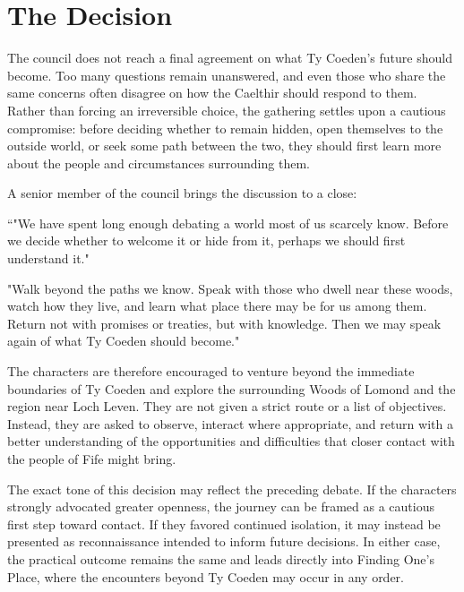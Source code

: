 \section*{The Decision}
{\entryfont The council does not reach a final agreement on what Ty Coeden's future should become. Too many questions remain unanswered, and even those who share the same concerns often disagree on how the Caelthir should respond to them. Rather than forcing an irreversible choice, the gathering settles upon a cautious compromise: before deciding whether to remain hidden, open themselves to the outside world, or seek some path between the two, they should first learn more about the people and circumstances surrounding them.

A senior member of the council brings the discussion to a close:}
\begin{DndReadAloud}
	“"We have spent long enough debating a world most of us scarcely know. Before we decide whether to welcome it or hide from it, perhaps we should first understand it."

	"Walk beyond the paths we know. Speak with those who dwell near these woods, watch how they live, and learn what place there may be for us among them. Return not with promises or treaties, but with knowledge. Then we may speak again of what Ty Coeden should become."
\end{DndReadAloud}
{\noindent\entryfont The characters are therefore encouraged to venture beyond the immediate boundaries of Ty Coeden and explore the surrounding Woods of Lomond and the region near Loch Leven. They are not given a strict route or a list of objectives. Instead, they are asked to observe, interact where appropriate, and return with a better understanding of the opportunities and difficulties that closer contact with the people of Fife might bring.

The exact tone of this decision may reflect the preceding debate. If the characters strongly advocated greater openness, the journey can be framed as a cautious first step toward contact. If they favored continued isolation, it may instead be presented as reconnaissance intended to inform future decisions. In either case, the practical outcome remains the same and leads directly into Finding One's Place, where the encounters beyond Ty Coeden may occur in any order.}